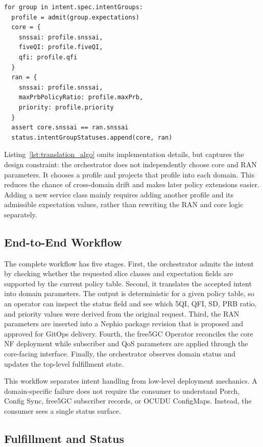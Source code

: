 \begin{lstlisting}[caption={Simplified translation procedure}, label={lst:translation_algo}]
for group in intent.spec.intentGroups:
  profile = admit(group.expectations)
  core = {
    snssai: profile.snssai,
    fiveQI: profile.fiveQI,
    qfi: profile.qfi
  }
  ran = {
    snssai: profile.snssai,
    maxPrbPolicyRatio: profile.maxPrb,
    priority: profile.priority
  }
  assert core.snssai == ran.snssai
  status.intentGroupStatuses.append(core, ran)
\end{lstlisting}

Listing~\ref{lst:translation_algo} omits implementation details, but captures the design constraint: the orchestrator does not independently choose core and RAN parameters. It chooses a profile and projects that profile into each domain. This reduces the chance of cross-domain drift and makes later policy extensions easier. Adding a new service class mainly requires adding another profile and its admissible expectation values, rather than rewriting the RAN and core logic separately.

\subsection{End-to-End Workflow}
\label{subsec:e2e_workflow}

The complete workflow has five stages. First, the orchestrator admits the intent by checking whether the requested slice classes and expectation fields are supported by the current policy table. Second, it translates the accepted intent into domain parameters. The output is deterministic for a given policy table, so an operator can inspect the status field and see which 5QI, QFI, SD, PRB ratio, and priority values were derived from the original request. Third, the RAN parameters are inserted into a Nephio package revision that is proposed and approved for GitOps delivery. Fourth, the free5GC Operator reconciles the core NF deployment while subscriber and QoS parameters are applied through the core-facing interface. Finally, the orchestrator observes domain status and updates the top-level fulfillment state.

This workflow separates intent handling from low-level deployment mechanics. A domain-specific failure does not require the consumer to understand Porch, Config Sync, free5GC subscriber records, or OCUDU ConfigMaps. Instead, the consumer sees a single status surface.

\subsection{Fulfillment and Status}

